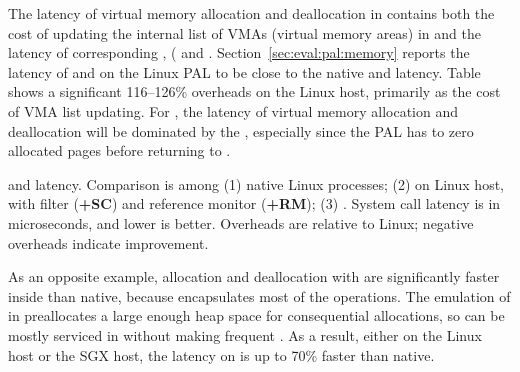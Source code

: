 \label{sec:eval:libos:vma}

The latency of virtual memory allocation
and deallocation in \thelibos{}
contains both the cost of updating the internal list of VMAs (virtual memory areas) in \thelibos{}
and the latency of corresponding \hostapis{}, ( and .
Section~\ref{sec:eval:pal:memory}
reports the latency of  and 
on the Linux PAL
to be close to the native 
and  latency.
Table~\label{tab:eval:libos:lmbench-vma} shows a significant 116--126\% overheads
on the Linux host,
primarily as the cost of VMA list updating.
For \graphenesgx{},
the latency of virtual memory allocation
and deallocation will be dominated by the \hostapis{}, especially since the \sgx{} PAL has to zero allocated pages before returning to \thelibos{}.



\begin{table}[t!b!]

\caption{ and  latency. Comparison is among (1) native Linux processes; (2) \graphene{} on Linux host, with \seccomp{} filter ({\bf +SC}) and reference monitor ({\bf +RM}); (3) \graphenesgx{}.
System call latency is in microseconds, and lower is better.
Overheads are relative to Linux; negative overheads indicate improvement.} 
\label{tab:eval:libos:lmbench-vma}
\end{table}


As an opposite example, allocation and deallocation
with  are
significantly faster inside \thelibos{}
than native,
because \thelibos{} encapsulates most of the operations.
The emulation of  in \thelibos{}
preallocates a large enough
heap space for consequential allocations,
so  can be mostly serviced in \thelibos{}
without making frequent \hostapis{}.
As a result, either on the Linux host or the SGX host,
the latency on 
is up to 70\% faster than native.

